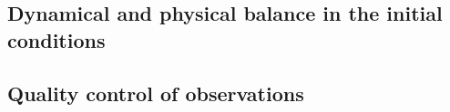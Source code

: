 \subsection{Dynamical and physical balance in the initial conditions}
\label{sub:data_assimilation:balance}

\subsection{Quality control of observations}
\label{sub:data_assimilation:quality}



